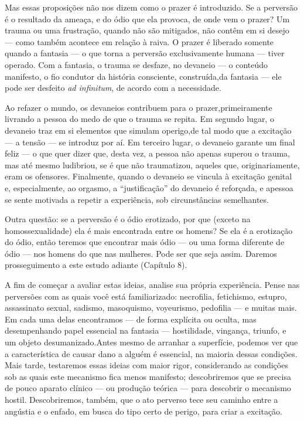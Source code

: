 Mas essas proposições não nos dizem como o prazer é introduzido. Se
a perversão é o resultado da ameaça, e do ódio que ela provoca, de onde
vem o prazer? Um trauma ou uma frustração, quando não são mitigados,
não contêm em si desejo --- como também acontece em relação à raiva. O
prazer é liberado somente quando a fantasia --- o que torna a perversão
exclusivamente humana --- tiver operado. Com a fantasia, o trauma se
desfaz\idxtraumadesf[|(] e, no devaneio --- o conteúdo manifesto, o fio condutor da
história consciente, construída,\idxfantacons[|)] da fantasia --- ele pode ser
desfeito \textit{ad infinitum}, de acordo com a necessidade.

Ao refazer o mundo, os devaneios contribuem para o prazer,\idxfantapraz[|)]
primeiramente livrando a pessoa do medo de que o trauma se repita. Em
segundo lugar, o devaneio traz em si elementos que simulam o\idxpervexpos[|)] perigo,\idxfantaexpo[|)] de
tal modo que a excitação --- a tensão --- se introduz por aí. Em terceiro
lugar, o devaneio garante um final feliz --- o que quer dizer que,
desta vez, a pessoa não apenas superou o trauma, mas até mesmo
ludibriou, se é que não traumatizou, aqueles que, originariamente, eram
os ofensores. Finalmente, quando o devaneio se vincula à excitação
genital e, especialmente, ao orgasmo, a
``justificação'' do devaneio é reforçada, e a\idxpraz[|)]
pessoa se sente\idxtraumanece{} motivada a repetir\idxpervrepet{} a experiência, sob circunstâncias
semelhantes.\idxtraumadesf[|)]

Outra questão: se a perversão é o ódio erotizado, por que (exceto na
homossexualidade) ela é mais encontrada entre os homens?\idxpervpredo{} Se ela
é a erotização do ódio, então teremos que encontrar mais ódio --- ou uma
forma diferente de ódio --- nos homens do que nas mulheres. Pode ser que
seja assim. Daremos prosseguimento a este estudo adiante (Capítulo 8).

A fim de começar a avaliar estas ideias, analise sua própria
experiência.\idxinfan{} Pense nas perversões com as quais você está familiarizado:
necrofilia,\idxnecro{} fetichismo,\idxfetic{} estupro,\idxestup{} assassinato sexual,\idxassas{} sadismo,\idxsadi{} masoquismo,\idxmasoq{} voyeurismo,\idxvoy{} pedofilia\idxpedof{} --- e muitas mais. Em cada uma delas
encontramos --- de forma explícita ou oculta, mas desempenhando papel
essencial na fantasia --- hostilidade,\idxhost{} vingança, triunfo, e um objeto
desumanizado.\idxdesufant[|)] Antes mesmo de arranhar a superfície, podemos ver que a
característica de causar dano a alguém é essencial, na maioria dessas
condições. Mais tarde, testaremos essas ideias com maior rigor,
considerando as condições sob as quais este mecanismo fica menos
manifesto; descobriremos que se precisa de pouco aparato clínico --- ou
produção teórica --- para descobrir o mecanismo hostil. Descobriremos,
também, que o ato perverso tece seu caminho entre a angústia e o\idxpervenfad{} enfado,\idxenfa{} em busca do tipo certo de perigo, para criar a excitação.

